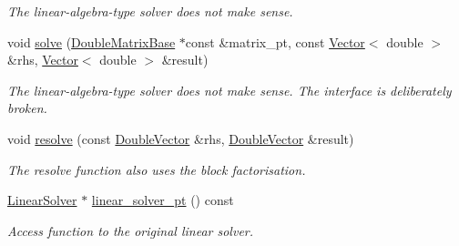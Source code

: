 \begin{DoxyCompactItemize}
\begin{DoxyCompactList}\small\item\em The linear-\/algebra-\/type solver does not make sense. \end{DoxyCompactList}\item 
void \hyperlink{classoomph_1_1BlockHopfLinearSolver_a5074e6a65910bcbe881a3e1c71b1947f}{solve} (\hyperlink{classoomph_1_1DoubleMatrixBase}{Double\+Matrix\+Base} $\ast$const \&matrix\+\_\+pt, const \hyperlink{classoomph_1_1Vector}{Vector}$<$ double $>$ \&rhs, \hyperlink{classoomph_1_1Vector}{Vector}$<$ double $>$ \&result)
\begin{DoxyCompactList}\small\item\em The linear-\/algebra-\/type solver does not make sense. The interface is deliberately broken. \end{DoxyCompactList}\item 
void \hyperlink{classoomph_1_1BlockHopfLinearSolver_a2c0e342f253917e987f8504b16862b2c}{resolve} (const \hyperlink{classoomph_1_1DoubleVector}{Double\+Vector} \&rhs, \hyperlink{classoomph_1_1DoubleVector}{Double\+Vector} \&result)
\begin{DoxyCompactList}\small\item\em The resolve function also uses the block factorisation. \end{DoxyCompactList}\item 
\hyperlink{classoomph_1_1LinearSolver}{Linear\+Solver} $\ast$ \hyperlink{classoomph_1_1BlockHopfLinearSolver_ada05d83bb3b4b1024dd19bf07d4374eb}{linear\+\_\+solver\+\_\+pt} () const
\begin{DoxyCompactList}\small\item\em Access function to the original linear solver. \end{DoxyCompactList}\end{DoxyCompactItemize}
